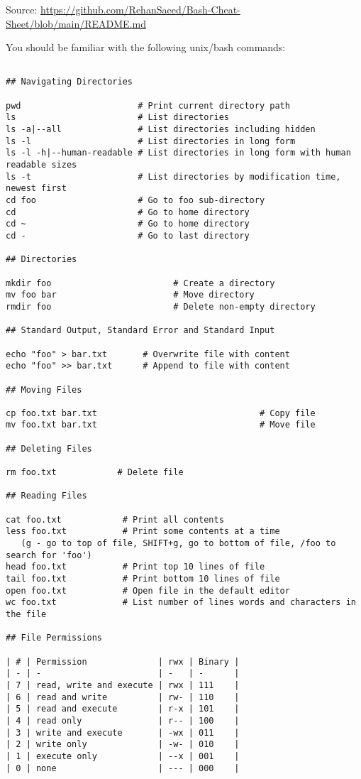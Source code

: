 \documentclass[12pt]{article}
\begin{document}
Source:
\url{https://github.com/RehanSaeed/Bash-Cheat-Sheet/blob/main/README.md}

You should be familiar with the following unix/bash commands:

\begin{verbatim}

## Navigating Directories

pwd                       # Print current directory path
ls                        # List directories
ls -a|--all               # List directories including hidden
ls -l                     # List directories in long form
ls -l -h|--human-readable # List directories in long form with human readable sizes
ls -t                     # List directories by modification time, newest first
cd foo                    # Go to foo sub-directory
cd                        # Go to home directory
cd ~                      # Go to home directory
cd -                      # Go to last directory

## Directories

mkdir foo                        # Create a directory
mv foo bar                       # Move directory
rmdir foo                        # Delete non-empty directory

## Standard Output, Standard Error and Standard Input

echo "foo" > bar.txt       # Overwrite file with content
echo "foo" >> bar.txt      # Append to file with content

## Moving Files

cp foo.txt bar.txt                                # Copy file
mv foo.txt bar.txt                                # Move file

## Deleting Files

rm foo.txt            # Delete file

## Reading Files

cat foo.txt            # Print all contents
less foo.txt           # Print some contents at a time 
   (g - go to top of file, SHIFT+g, go to bottom of file, /foo to search for 'foo')
head foo.txt           # Print top 10 lines of file
tail foo.txt           # Print bottom 10 lines of file
open foo.txt           # Open file in the default editor
wc foo.txt             # List number of lines words and characters in the file

## File Permissions

| # | Permission              | rwx | Binary |
| - | -                       | -   | -      |
| 7 | read, write and execute | rwx | 111    |
| 6 | read and write          | rw- | 110    |
| 5 | read and execute        | r-x | 101    |
| 4 | read only               | r-- | 100    |
| 3 | write and execute       | -wx | 011    |
| 2 | write only              | -w- | 010    |
| 1 | execute only            | --x | 001    |
| 0 | none                    | --- | 000    |


\end{verbatim}
\end{document}

